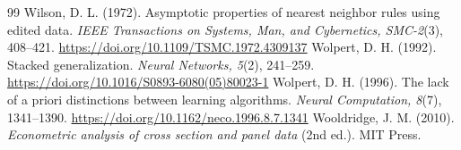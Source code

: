 \begin{thebibliography}{99}
 Wilson, D. L. (1972). Asymptotic properties of nearest neighbor rules using edited data. \textit{IEEE Transactions on Systems, Man, and Cybernetics, SMC-2}(3), 408--421. \url{https://doi.org/10.1109/TSMC.1972.4309137}
 Wolpert, D. H. (1992). Stacked generalization. \textit{Neural Networks, 5}(2), 241--259. \url{https://doi.org/10.1016/S0893-6080(05)80023-1}
 Wolpert, D. H. (1996). The lack of a priori distinctions between learning algorithms. \textit{Neural Computation, 8}(7), 1341--1390. \url{https://doi.org/10.1162/neco.1996.8.7.1341}
 Wooldridge, J. M. (2010). \textit{Econometric analysis of cross section and panel data} (2nd ed.). MIT Press.%
\end{thebibliography}


